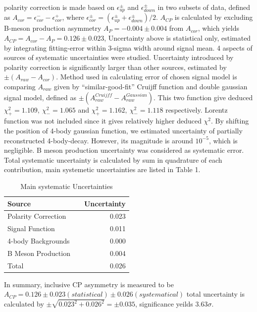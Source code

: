 \documentclass[12pt, twoside, notitlepage, twocolumn]{article}
\begin{document}
        polarity correction is made based on $\epsilon^\pm_{up}$ and $\epsilon^\pm_{down}$ in two subsets of data, defined as 
        $A_{cor}=\epsilon_{cor}^--\epsilon_{cor}^+$, where $\epsilon_{cor}^\pm = (\epsilon^\pm_{up}+\epsilon^\pm_{down})/2$.
        $A_{CP}$ is calculated by excluding B-meson production asymmetry $A_P = -0.004\pm0.004$\cite{1310.4740} from $A_{cor}$, which 
        yields $A_{CP} = A_{cor} - A_P = 0.126 \pm 0.023$, Uncertainty above is statistical only, estimated by integrating 
        fitting-error within 3-sigma width around signal mean. 4 aspects of sources of systematic uncertainties were studied. Uncertainty 
        introduced by polarity correction is significantly larger than other sources, estimated by $\pm(A_{raw}-A_{cor})$. Method used in 
        calculating error of chosen signal model is comparing $A_{raw}$ given by ``similar-good-fit'' Cruijff function and double 
        gaussian signal model, defined as $\pm(A_{raw}^{Cruijff}-A_{raw}^{Gaussian})$. This two function give deduced 
        $\chi^2_+=1.109,\ \chi^2_-=1.065$ and $\chi^2_+=1.162,\ \chi^2_-=1.118$ respectively. Lorentz function was not included since it gives relatively 
        higher deduced $\chi^2$. By shifting the position of 4-body gaussian function, we estimated uncertainty of partially reconstructed 
        4-body-decay. However, its magnitude is around $10^{-5}$, which is negligible. B meson production uncertainty was considered as 
        systematic error. Total \newpage{} systematic uncertainty is calculated 
        by sum in quadrature of each contribution, main systemetic uncertainties are listed in Table 1.
        \begin{table}[ht]
            \centering
            \caption{Main systematic Uncertainties}
            \begin{tabularx}{9.73cm}{lXr}
            \hline
            Source & & Uncertainty \\
            \hline
            Polarity Correction  & & 0.023 \\
            Signal Function  & & 0.011 \\
            4-body Backgrounds & & 0.000 \\
            B Meson Production & & 0.004 \\
            \hline
            Total & & 0.026 \\
            \hline
            \end{tabularx}
        \end{table}
        \newline In summary, inclusive CP asymmetry is measured to be $A_{CP} = 0.126\pm0.023(statistical)\pm0.026(systematical)$
        total uncertainty is calculated by $\pm \sqrt{0.023^2+0.026^2}=\pm 0.035$, significance yeilds $3.63\sigma$.
\end{document}
